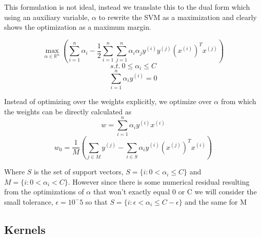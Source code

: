 \documentclass[10pt,twocolumn]{article}
\begin{document}
    
This formulation is not ideal, instead we translate this to the dual form which using an auxiliary variable, $\alpha$ to rewrite the SVM as a maximization and clearly shows the optimization as a maximum margin. 

\begin{equation}
\max_{\alpha \in \mathbb{R}^n} ( \sum_{i=1}^n \alpha_i - \frac{1}{2} \sum_{i=1}^n \sum_{j=1}^n \alpha_i \alpha_j y^{(i)} y^{(j)} (x^{(i)})^T x^{(j)})
\end{equation}
\begin{equation}
s.t. \: 0 \leq \alpha_i \leq C
\end{equation}
\begin{equation}
\sum_{i=1}^n \alpha_i y^{(i)} =0
\end{equation}

Instead of optimizing over the weights explicitly, we optimize over $\alpha$ from which the weights can be directly calculated as 
\begin{equation}
w= \sum_{i=1}^n \alpha_i y^{(i)}x^{(i)}
\end{equation}  
\begin{equation}
w_0= \frac{1}{M} ( \sum_{j \in M} y^{(j)} - \sum_{i \in S} \alpha_i y^{(i)}(x^{(j)})^Tx^{(i)})
\end{equation}

Where $S$ is the set of support vectors, $S=\{i : 0 < \alpha_i \leq C \}$ and $M = \{i : 0 < \alpha_i < C \}$. However since there is some numerical residual resulting from the optimizations of $\alpha$ that won't exactly equal 0 or C we will consider the small tolerance, $\epsilon= 10^-5$ so that  $S=\{i : \epsilon < \alpha_i \leq C-\epsilon \}$ and the same for M

\subsection*{Kernels}
      
\end{document}
